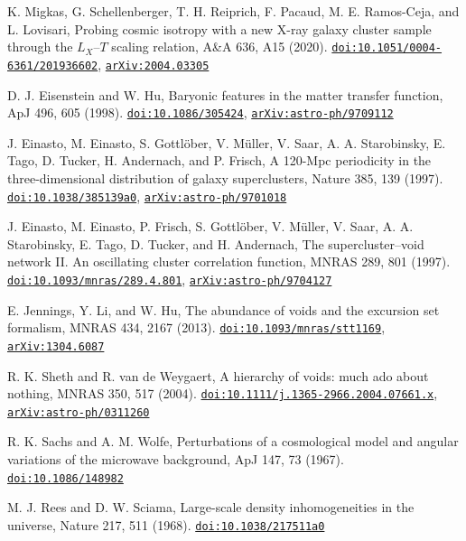 \documentclass[11pt,a4paper]{article}
\begin{document}
\begin{description}[leftmargin=2.6em,labelwidth=2.2em,labelsep=0.4em,itemsep=1pt,parsep=0pt,font=\normalfont]
\item[{[16]}] K. Migkas, G. Schellenberger, T. H. Reiprich, F. Pacaud, M. E. Ramos-Ceja, and L. Lovisari, Probing cosmic isotropy with a new X-ray galaxy cluster sample through the $L_X$–$T$ scaling relation, A\&A 636, A15 (2020). \href{https://doi.org/10.1051/0004-6361/201936602}{\nolinkurl{doi:10.1051/0004-6361/201936602}}, \href{https://arxiv.org/abs/2004.03305}{\nolinkurl{arXiv:2004.03305}}
\item[{[17]}] D. J. Eisenstein and W. Hu, Baryonic features in the matter transfer function, ApJ 496, 605 (1998). \href{https://doi.org/10.1086/305424}{\nolinkurl{doi:10.1086/305424}}, \href{https://arxiv.org/abs/astro-ph/9709112}{\nolinkurl{arXiv:astro-ph/9709112}}
\item[{[18]}] J. Einasto, M. Einasto, S. Gottlöber, V. Müller, V. Saar, A. A. Starobinsky, E. Tago, D. Tucker, H. Andernach, and P. Frisch, A 120-Mpc periodicity in the three-dimensional distribution of galaxy superclusters, Nature 385, 139 (1997). \href{https://doi.org/10.1038/385139a0}{\nolinkurl{doi:10.1038/385139a0}}, \href{https://arxiv.org/abs/astro-ph/9701018}{\nolinkurl{arXiv:astro-ph/9701018}}
\item[{[19]}] J. Einasto, M. Einasto, P. Frisch, S. Gottlöber, V. Müller, V. Saar, A. A. Starobinsky, E. Tago, D. Tucker, and H. Andernach, The supercluster–void network II. An oscillating cluster correlation function, MNRAS 289, 801 (1997). \href{https://doi.org/10.1093/mnras/289.4.801}{\nolinkurl{doi:10.1093/mnras/289.4.801}}, \href{https://arxiv.org/abs/astro-ph/9704127}{\nolinkurl{arXiv:astro-ph/9704127}}
\item[{[20]}] E. Jennings, Y. Li, and W. Hu, The abundance of voids and the excursion set formalism, MNRAS 434, 2167 (2013). \href{https://doi.org/10.1093/mnras/stt1169}{\nolinkurl{doi:10.1093/mnras/stt1169}}, \href{https://arxiv.org/abs/1304.6087}{\nolinkurl{arXiv:1304.6087}}
\item[{[21]}] R. K. Sheth and R. van de Weygaert, A hierarchy of voids: much ado about nothing, MNRAS 350, 517 (2004). \href{https://doi.org/10.1111/j.1365-2966.2004.07661.x}{\nolinkurl{doi:10.1111/j.1365-2966.2004.07661.x}}, \href{https://arxiv.org/abs/astro-ph/0311260}{\nolinkurl{arXiv:astro-ph/0311260}}
\item[{[22]}] R. K. Sachs and A. M. Wolfe, Perturbations of a cosmological model and angular variations of the microwave background, ApJ 147, 73 (1967). \href{https://doi.org/10.1086/148982}{\nolinkurl{doi:10.1086/148982}}
\item[{[23]}] M. J. Rees and D. W. Sciama, Large-scale density inhomogeneities in the universe, Nature 217, 511 (1968). \href{https://doi.org/10.1038/217511a0}{\nolinkurl{doi:10.1038/217511a0}}
\end{description}
\end{document}
